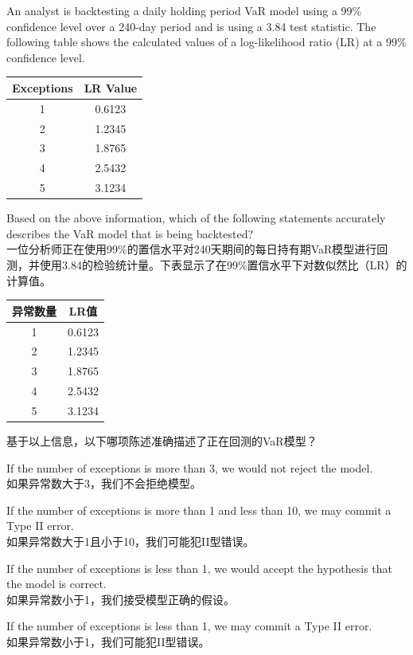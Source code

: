 \documentclass{article}
\newcounter{question} %
\begin{document}
\begin{question}
    An analyst is backtesting a daily holding period VaR model using a 99\% confidence level over a 240-day period and is using a 3.84 test statistic. The following table shows the calculated values of a log-likelihood ratio (LR) at a 99\% confidence level. 

    \begin{table}[H]
        \centering
        \begin{tabular}{|c|c|}
            \hline
            Exceptions & LR Value \\
            \hline
            1 & 0.6123 \\
            2 & 1.2345 \\
            3 & 1.8765 \\
            4 & 2.5432 \\
            5 & 3.1234 \\
            \hline
        \end{tabular}
    \end{table}
    Based on the above information, which of the following statements accurately describes the VaR model that is being backtested?
    \\一位分析师正在使用99\%的置信水平对240天期间的每日持有期VaR模型进行回测，并使用3.84的检验统计量。下表显示了在99\%置信水平下对数似然比（LR）的计算值。

    \begin{table}[H]
        \centering
        \begin{tabular}{|c|c|}
            \hline
            异常数量 & LR值 \\
            \hline
            1 & 0.6123 \\
            2 & 1.2345 \\
            3 & 1.8765 \\
            4 & 2.5432 \\
            5 & 3.1234 \\
            \hline
        \end{tabular}
    \end{table}
    基于以上信息，以下哪项陈述准确描述了正在回测的VaR模型？
\end{question}

\begin{choices}
    \item If the number of exceptions is more than 3, we would not reject the model.\\
        如果异常数大于3，我们不会拒绝模型。
    \item If the number of exceptions is more than 1 and less than 10, we may commit a Type II error.\\
        如果异常数大于1且小于10，我们可能犯II型错误。
    \item If the number of exceptions is less than 1, we would accept the hypothesis that the model is correct.\\
        如果异常数小于1，我们接受模型正确的假设。
    \item If the number of exceptions is less than 1, we may commit a Type II error.\\
        如果异常数小于1，我们可能犯II型错误。
\end{choices}
\end{document}
